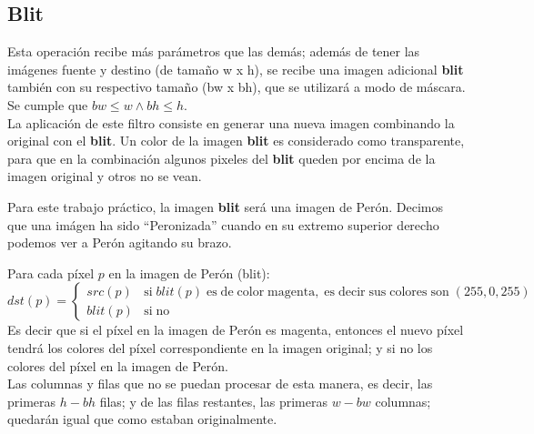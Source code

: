 \subsection{Blit}

Esta operaci\'on recibe m\'as par\'ametros que las dem\'as; adem\'as de tener las im\'agenes fuente y destino (de tama\~no w x h), 
se recibe una imagen adicional \textbf{blit} tambi\'en con su respectivo tama\~no (bw x bh), que se utilizar\'a a modo de m\'ascara.
Se cumple que $bw \leq w \wedge bh \leq h$.\\

La aplicaci\'on de este filtro consiste en generar una nueva imagen combinando la original con el \textbf{blit}.
Un color de la imagen \textbf{blit} es considerado como transparente,
para que en la combinaci\'on algunos pixeles del \textbf{blit} queden por encima de la imagen original y otros no se vean.

Para este trabajo pr\'actico, la imagen \textbf{blit} ser\'a una imagen de Per\'on.
Decimos que una im\'agen ha sido ``Peronizada'' cuando en su extremo superior derecho podemos ver a Per\'on agitando su brazo.

\vskip 8pt
Para cada p\'ixel $p$ en la imagen de Per\'on (blit):\\
$dst(p) = \begin{cases}
    src(p) & \mathrm{si \;} blit(p) \mathrm{\; es \; de \; color \; magenta, \; es \; decir \; sus \; colores \; son \;} (255, 0, 255)\\
    blit(p) & \mathrm{si \; no}
\end{cases}$ \\

Es decir que si el p\'ixel en la imagen de Per\'on es magenta, entonces el nuevo p\'ixel tendr\'a los colores del p\'ixel correspondiente 
en la imagen original; y si no los colores del p\'ixel en la imagen de Per\'on. \\

Las columnas y filas que no se puedan procesar de esta manera, es decir, 
las primeras $h - bh$ filas; y de las filas restantes, las primeras $w - bw$ columnas; 
quedar\'an igual que como estaban originalmente. \\




